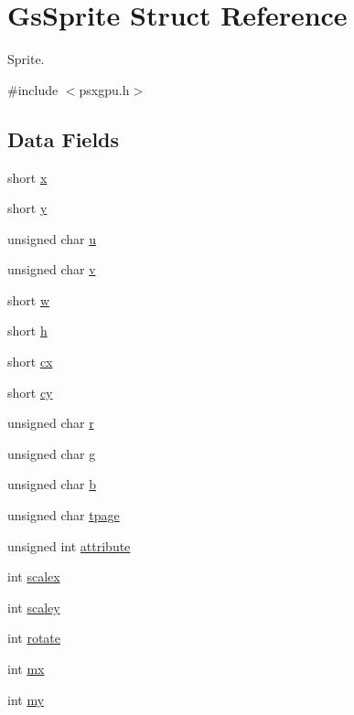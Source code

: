 \hypertarget{structGsSprite}{}\section{Gs\+Sprite Struct Reference}
\label{structGsSprite}


Sprite.  




{\ttfamily \#include $<$psxgpu.\+h$>$}

\subsection*{Data Fields}
\begin{DoxyCompactItemize}
\item 
short \hyperlink{structGsSprite_a1c067283cdc61f263e5b7e45ff714d4d}{x}
\item 
short \hyperlink{structGsSprite_af747b4473fd4a9616a2da218cf313c61}{y}
\item 
unsigned char \hyperlink{structGsSprite_aab15a5e9d8e1e725b9a73055191efba4}{u}
\item 
unsigned char \hyperlink{structGsSprite_a56bd7e047d09ffe30f420820c3b76f51}{v}
\item 
short \hyperlink{structGsSprite_ab5336006a83518fd31c54107de9dbc18}{w}
\item 
short \hyperlink{structGsSprite_a90c08fcc2c8d6402cd1a21c863d8aa78}{h}
\item 
short \hyperlink{structGsSprite_a503442e464a4e8174ad381b78da8d6bf}{cx}
\item 
short \hyperlink{structGsSprite_ab181813aca32de73f42adf7032eeca67}{cy}
\item 
unsigned char \hyperlink{structGsSprite_a6dae0cf0d343b5de7760dc2cbd03c6bc}{r}
\item 
unsigned char \hyperlink{structGsSprite_ae0775157cf6148b986fe581ba7cb4216}{g}
\item 
unsigned char \hyperlink{structGsSprite_a331ea5fed7c5dd3d049d3c05a6e8168b}{b}
\item 
unsigned char \hyperlink{structGsSprite_ad29755b3e340cdb63658e3ba9f18ee34}{tpage}
\item 
unsigned int \hyperlink{structGsSprite_a38d044e1d2010483d2a2afccce099674}{attribute}
\item 
int \hyperlink{structGsSprite_a585c68a301af14f5e542ce61364d501b}{scalex}
\item 
int \hyperlink{structGsSprite_a27d5b483b9d62b6cec1dd386762a1b04}{scaley}
\item 
int \hyperlink{structGsSprite_aae41d35fedfb555a9576318d62b6bcd6}{rotate}
\item 
int \hyperlink{structGsSprite_a0406e4ad5fb44c2ea77914c6374dedea}{mx}
\item 
int \hyperlink{structGsSprite_aa9113c8ac5a60db6b076fc4a940d7812}{my}
\end{DoxyCompactItemize}


